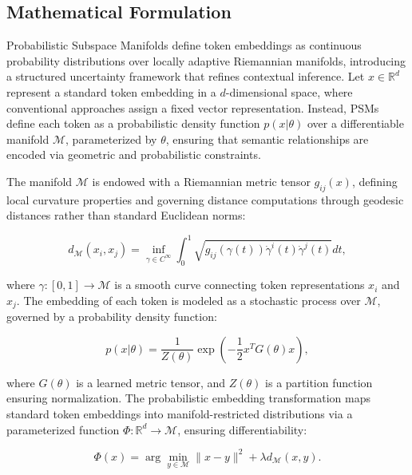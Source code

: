 \documentclass{article}
\begin{document}
\subsection{Mathematical Formulation}

Probabilistic Subspace Manifolds define token embeddings as continuous probability distributions over locally adaptive Riemannian manifolds, introducing a structured uncertainty framework that refines contextual inference. Let \( x \in \mathbb{R}^d \) represent a standard token embedding in a \( d \)-dimensional space, where conventional approaches assign a fixed vector representation. Instead, PSMs define each token as a probabilistic density function \( p(x | \theta) \) over a differentiable manifold \( \mathcal{M} \), parameterized by \( \theta \), ensuring that semantic relationships are encoded via geometric and probabilistic constraints.

The manifold \( \mathcal{M} \) is endowed with a Riemannian metric tensor \( g_{ij}(x) \), defining local curvature properties and governing distance computations through geodesic distances rather than standard Euclidean norms:

\begin{equation}
	d_{\mathcal{M}}(x_i, x_j) = \inf_{\gamma \in C^\infty} \int_0^1 \sqrt{ g_{ij}(\gamma(t)) \dot{\gamma}^i(t) \dot{\gamma}^j(t) } dt,
\end{equation}

where \( \gamma: [0,1] \to \mathcal{M} \) is a smooth curve connecting token representations \( x_i \) and \( x_j \). The embedding of each token is modeled as a stochastic process over \( \mathcal{M} \), governed by a probability density function:

\begin{equation}
	p(x | \theta) = \frac{1}{Z(\theta)} \exp \left( - \frac{1}{2} x^T G(\theta) x \right),
\end{equation}

where \( G(\theta) \) is a learned metric tensor, and \( Z(\theta) \) is a partition function ensuring normalization. The probabilistic embedding transformation maps standard token embeddings into manifold-restricted distributions via a parameterized function \( \Phi: \mathbb{R}^d \to \mathcal{M} \), ensuring differentiability:

\begin{equation}
	\Phi(x) = \arg\min_{y \in \mathcal{M}} \| x - y \|^2 + \lambda d_{\mathcal{M}}(x, y).
\end{equation}
\end{document}
